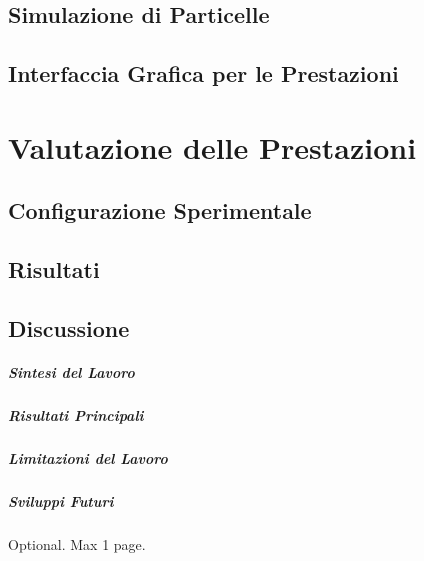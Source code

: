\documentclass[12pt,a4paper,openright,twoside]{book}
\begin{document}
\section{Simulazione di Particelle}

\section{Interfaccia Grafica per le Prestazioni}

\chapter{Valutazione delle Prestazioni}
\label{chap:valutazione}

\section{Configurazione Sperimentale}

\section{Risultati}

\section{Discussione}

\label{chap:conclusioni}

\paragraph{Sintesi del Lavoro}

\paragraph{Risultati Principali}

\paragraph{Limitazioni del Lavoro}

\paragraph{Sviluppi Futuri}

\backmatter

\nocite{*}




\begin{acknowledgements}
   Optional. Max 1 page.
\end{acknowledgements}
\end{document}
